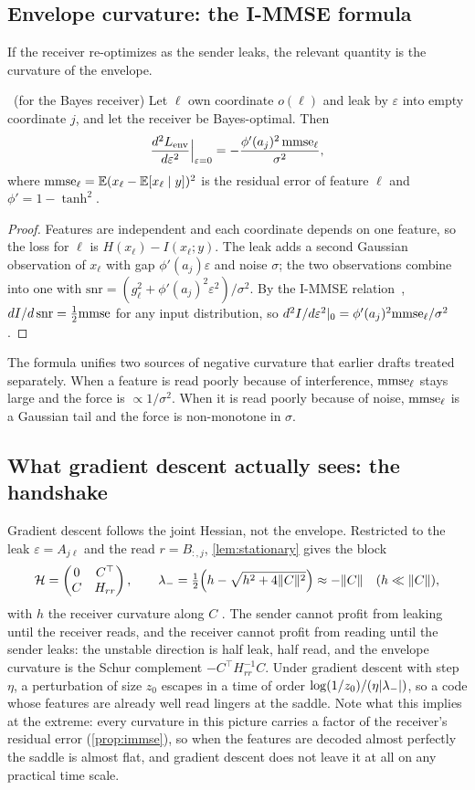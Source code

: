 \subsection{Envelope curvature: the I-MMSE formula}
If the receiver re-optimizes as the sender leaks, the relevant quantity is the curvature of the envelope.
\begin{proposition}\label{prop:immse}\proved\ (for the Bayes receiver)
Let $\ell$ own coordinate $o(\ell)$ and leak by $\varepsilon$ into empty coordinate $j$, and let the receiver be
Bayes-optimal. Then
\[
\frac{d^2L_{\rm env}}{d\varepsilon^2}\Big|_{\varepsilon=0}=-\frac{\phi'(a_j)^2\,\mathrm{mmse}_\ell}{\sigma^2},
\]
where $\mathrm{mmse}_\ell=\mathbb E(x_\ell-\mathbb E[x_\ell\mid y])^2$ is the residual error of feature $\ell$ and $\phi'=1-\tanh^2$.
\end{proposition}
\begin{proof}
Features are independent and each coordinate depends on one feature, so the loss for $\ell$ is
$H(x_\ell)-I(x_\ell;y)$. The leak adds a second Gaussian observation of $x_\ell$ with gap $\phi'(a_j)\varepsilon$ and
noise $\sigma$; the two observations combine into one with $\mathrm{snr}=(g_\ell^2+\phi'(a_j)^2\varepsilon^2)/\sigma^2$.
By the I-MMSE relation~\cite{GSV}, $dI/d\,\mathrm{snr}=\frac12\mathrm{mmse}$ for any input distribution, so
$d^2I/d\varepsilon^2|_0=\phi'(a_j)^2\mathrm{mmse}_\ell/\sigma^2$.
\end{proof}
The formula unifies two sources of negative curvature that earlier drafts treated separately. When a feature is read
poorly because of interference, $\mathrm{mmse}_\ell$ stays large and the force is $\propto1/\sigma^2$. When it is read poorly
because of noise, $\mathrm{mmse}_\ell$ is a Gaussian tail and the force is non-monotone in $\sigma$.

\subsection{What gradient descent actually sees: the handshake}
Gradient descent follows the joint Hessian, not the envelope. Restricted to the leak $\varepsilon=A_{j\ell}$ and the
read $r=B_{:,j}$, \cref{lem:stationary} gives the block
\[
\mathcal H=\begin{pmatrix}0&C^\top\\ C&H_{rr}\end{pmatrix},\qquad
\lambda_-=\tfrac12\Big(h-\sqrt{h^2+4\lVert C\rVert^2}\Big)\approx-\lVert C\rVert\quad(h\ll\lVert C\rVert),
\]
with $h$ the receiver curvature along $C$ \heur. The sender cannot profit from leaking until the receiver reads,
and the receiver cannot profit from reading until the sender leaks: the unstable direction is half leak, half read,
and the envelope curvature is the Schur complement $-C^\top H_{rr}^{-1}C$. Under gradient descent with step $\eta$,
a perturbation of size $z_0$ escapes in a time of order $\log(1/z_0)/(\eta\lvert \lambda_-\rvert)$, so a code whose features
are already well read lingers at the saddle. Note what this implies at the extreme: every curvature in this picture
carries a factor of the receiver's residual error (\cref{prop:immse}), so when the features are decoded almost
perfectly the saddle is almost flat, and gradient descent does not leave it at all on any practical time scale.

